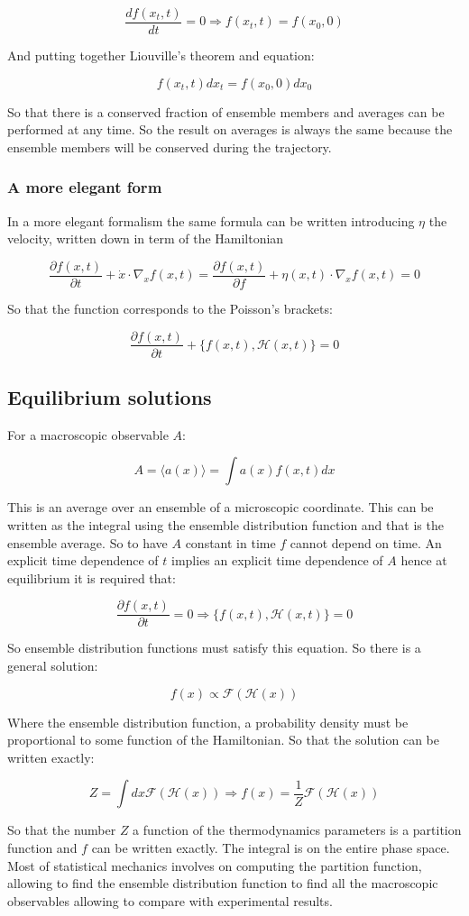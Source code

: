 		$$\frac{df(x_t, t)}{dt} = 0\Rightarrow f(x_t, t) = f(x_0, 0)$$

		And putting together Liouville's theorem and equation:

		$$f(x_t, t)dx_t = f(x_0, 0)dx_0$$

		So that there is a conserved fraction of ensemble members and averages can be performed at any time.
		So the result on averages is always the same because the ensemble members will be conserved during the trajectory.

		\subsubsection{A more elegant form}
		In a more elegant formalism the same formula can be written introducing $\eta$ the velocity, written down in term of the Hamiltonian

		$$\frac{\partial f(x,t)}{\partial t} + \dot{x}\cdot\nabla_x f(x,t) = \frac{\partial f(x,t)}{\partial f} + \eta(x,t)\cdot\nabla_{x}f(x,t) = 0$$

		So that the function corresponds to the Poisson's brackets:

		$$\frac{\partial f(x,t)}{\partial t} + \{f(x,t), \mathcal{H}(x,t)\} = 0$$

	\subsection{Equilibrium solutions}
	For a macroscopic observable $A$:

	$$A = \langle a(x)\rangle = \int a(x)f(x,t)dx$$

	This is an average over an ensemble of a microscopic coordinate.
	This can be written as the integral using the ensemble distribution function and that is the ensemble average.
	So to have $A$ constant in time $f$ cannot depend on time.
	An explicit time dependence of $t$ implies an explicit time dependence of $A$ hence at equilibrium it is required that:

	$$\frac{\partial f(x,t)}{\partial t} = 0\Rightarrow \{f(x,t), \mathcal{H}(x, t)\} = 0$$

	So ensemble distribution functions must satisfy this equation.
	So there is a general solution:

	$$f(x)\propto\mathcal{F}(\mathcal{H}(x))$$

	Where the ensemble distribution function, a probability density must be proportional to some function of the Hamiltonian.
	So that the solution can be written exactly:

	$$Z = \int dx\mathcal{F}(\mathcal{H}(x))\Rightarrow f(x) = \frac{1}{Z}\mathcal{F}(\mathcal{H}(x))$$

	So that the number $Z$ a function of the thermodynamics parameters is a partition function and $f$ can be written exactly.
	The integral is on the entire phase space.
	Most of statistical mechanics involves on computing the partition function, allowing to find the ensemble distribution function to find all the macroscopic observables allowing to compare with experimental results.
